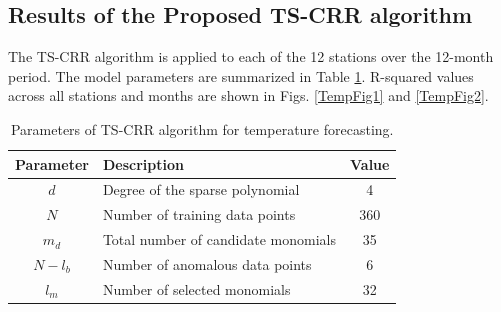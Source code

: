 \documentclass[smallextended,referee,envcountsect,,numbers]{svjour3}
\begin{document}
\subsection{Results of the Proposed TS-CRR algorithm}
\noindent The TS-CRR algorithm is applied to each of the 12 stations over the 12-month period. The model parameters are summarized in Table \ref{tab_temp_params}. R-squared values across all stations and months are shown in Figs. \ref{TempFig1} and \ref{TempFig2}.
\begin{table}[h!]
	\centering     
    \caption{Parameters of TS-CRR algorithm for temperature forecasting.
    \label{tab_temp_params}}
	\begin{tabular}{|c|l|c|}
		\hline
		\textbf{Parameter} & \textbf{Description} & \textbf{Value} \\\hline
		$d$     & Degree of the sparse polynomial     & 4    \\\hline
		$N$     & Number of training data points      & 360  \\\hline
		$m_d$   & Total number of candidate monomials & 35 \\\hline
		$N - l_b$ & Number of anomalous data points     & 6    \\\hline
		$l_m$   & Number of selected monomials  & 32 \\\hline
	\end{tabular}
\end{table}
\end{document}
